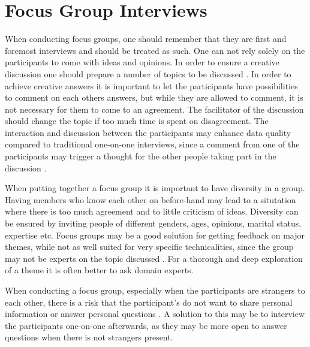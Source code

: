 \section{Focus Group Interviews}

When conducting focus groups, one should remember that they are first and foremost interviews and should be treated as such. One can not rely solely on the participants to come with ideas and opinions. In order to ensure a creative discussion one should prepare a number of topics to be discussed \cite{krueger2009focus}. In order to achieve creative answers it is important to let the participants have possibilities to comment on each others answers, but while they are allowed to comment, it is not necessary for them to come to an agreement. The facilitator of the discussion should change the topic if too much time is spent on disagreement. 
The interaction and discussion between the participants may enhance data quality compared to traditional one-on-one interviews, since a comment from one of the participants may trigger a thought for the other people taking part in the discussion \cite{krueger2000focus}.  

When putting together a focus group it is important to have diversity in a group. Having members who know each other on before-hand may lead to a situtation where there is too much agreement and to little criticism of ideas. Diversity can be ensured by inviting people of different genders, ages, opinions, marital status, expertise etc. 
Focus groups may be a good solution for getting feedback on major themes, while not as well suited for very specific technicalities, since the group may not be experts on the topic discussed \cite{krueger2009focus}. For a thorough and deep exploration of a theme it is often better to ask domain experts.

When conducting a focus group, especially when the participants are strangers to each other, there is a risk that the participant's do not want to share personal information or answer personal questions \cite{kaplowitz2000statistical}. A solution to this may be to interview the participants one-on-one afterwards, as they may be more open to answer questions when there is not strangers present. 